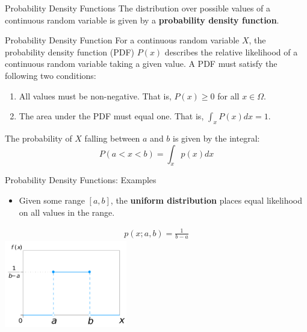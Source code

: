 \documentclass[serif,xcolor=pdftex,dvipsnames,table,hyperref={bookmarks=false,breaklinks}]{beamer}
\begin{document}
\begin{frame}[t]{Probability Density Functions}
	The distribution over possible values of a continuous random variable is given by a \textbf{probability density function}.
	\begin{block}{Probability Density Function}
		For a continuous random variable $X$, the probability density function (PDF) $P(x)$ describes the relative likelihood of a continuous random variable taking a given value. A PDF must satisfy the following two conditions:
		\begin{enumerate}[<+->]
			\item All values must be non-negative. That is, $P(x) \geq 0$ for all $x \in \Omega$.
			\item The area under the PDF must equal one. That is, $\int_x P(x) dx = 1$.
		\end{enumerate}
		\pause
		The probability of $X$ falling between $a$ and $b$ is given by the integral:
		$$P(a < x < b) = \int_x p(x) dx$$
	\end{block}
\end{frame}

\begin{frame}[t]{Probability Density Functions: Examples}
	\begin{itemize}
		\item Given some range $[a,b]$, the \textbf{uniform distribution} places equal likelihood on all values in the range.
	\end{itemize}
	\pause
	\begin{align*}
		p(x;a,b) = \frac{1}{b - a}
	\end{align*}
	\centering
	\includegraphics[height=1.5in]{../Figures/Uniform_Distribution_PDF_SVG.png}
\end{frame}
\end{document}
